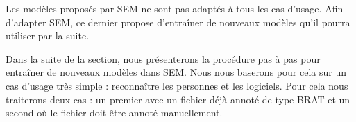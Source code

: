 \documentclass[manual-fr.tex]{subfiles}
\begin{document}
Les modèles proposés par SEM ne sont pas adaptés à tous les cas d'usage. Afin d'adapter SEM, ce dernier propose d'entraîner de nouveaux modèles qu'il pourra utiliser par la suite.

Dans la suite de la section, nous présenterons la procédure pas à pas pour entraîner de nouveaux modèles dans SEM. Nous nous baserons pour cela sur un cas d'usage très simple : reconnaître les personnes et les logiciels. Pour cela nous traiterons deux cas : un premier avec un fichier déjà annoté de type BRAT et un second où le fichier doit être annoté manuellement.
\end{document}
